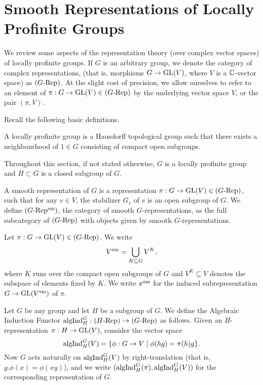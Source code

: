 \documentclass[../main.tex]{subfiles}
\begin{document}
\section{Smooth Representations of Locally Profinite Groups}
We review some aspects of the representation theory (over complex vector spaces)
of locally profinite groups. 
If $G$ is an arbitrary group, we denote the category of complex representations,
(that is, morphisms $G \to \operatorname{GL}(V)$, where $V$ is a $\mathbb{C}$-vector space) as
${({G}\text-\allowbreak\mathrm{Rep})}$. At the slight cost of precision, we allow ourselves to refer to an element of 
$\pi: G \to \operatorname{GL}(V) \in {({G}\text-\allowbreak\mathrm{Rep})}$ by the underlying vector space $V$, or the 
pair $(\pi, V)$. 

Recall the following basic definitions.
\begin{defi}
  A locally profinite group is a Hausdorff topological group such that there exists 
  a neighbourhood of $1 \in G$ consisting of compact open subgroups.
\end{defi}
Throughout this section, if not stated otherwise, $G$ is a locally profinite
group and $H \subset G$ is a closed subgroup of $G$.

\begin{defi}
  A smooth representation of $G$ is a
  representation $\pi: G \to \operatorname{GL}(V) \in {({G}\text-\allowbreak\mathrm{Rep})}$,
  such that for any $v \in V$, the stabilizer $G_v$ of $v$ is an open subgroup
  of $G$. We define ${({G}\text-\allowbreak\mathrm{Rep^{\mathrm{sm}}})}$, the category of smooth $G$-representations, as
  the full subcategory of ${({G}\text-\allowbreak\mathrm{Rep})}$ with objects given by smooth
  $G$-representations.
\end{defi}

\begin{defi}
  Let $\pi:G \to \operatorname{GL}(V) \in {({G}\text-\allowbreak\mathrm{Rep})}$. We write 
  \begin{equation*}
    V^{\mathrm{sm}} = \bigcup_{K \subseteq G} V^K,
  \end{equation*}
  where $K$ runs over the compact open subgroups of $G$ and $V^K \subseteq V$ denotes the 
  subspace of elements fixed by $K$. We write $\pi^{\mathrm{sm}}$ for 
  the induced subrepresentation $G \to \operatorname{GL}(V^{\mathrm{sm}})$ of $\pi$.
\end{defi}

\begin{defi}
  Let $G$ be any group and let $H$ be a subgroup of $G$. We define the Algebraic
  Induction Functor $\mathrm{algInd}_H^G: {({H}\text-\allowbreak\mathrm{Rep})} \to {({G}\text-\allowbreak\mathrm{Rep})}$ as follows. Given an
  $H$-representation $\pi: H \to \operatorname{GL}(V)$, consider the vector space
  \begin{equation*}
    \mathrm{algInd}_H^G(V) = \{\phi: G \to V \mid \phi(hg) = \pi(h) g\}.
  \end{equation*}
  Now $G$ acts naturally on $\mathrm{algInd}_H^G(V)$ by right-translation (that is, 
  $g.\phi(x) = \phi(xg)$), and we write
  $(\mathrm{algInd}_H^G(\pi),\mathrm{algInd}_H^G(V))$ for the corresponding representation of $G$.
\end{defi}
\end{document}
